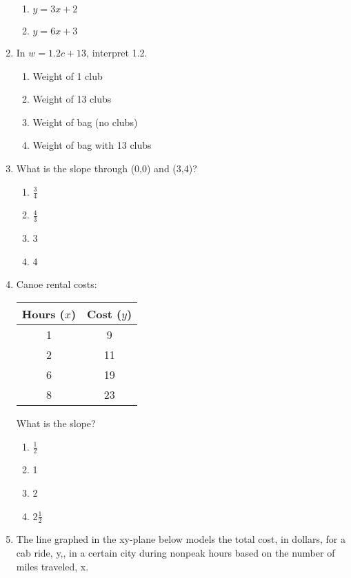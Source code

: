 \documentclass[12pt]{exam}
\begin{document}
\begin{enumerate}
\begin{enumerate}[label=\Alph*)]
        \item $y = 3x + 2$
        \item $y = 6x + 3$
    \end{enumerate}
    \item In $w = 1.2c + 13$, interpret 1.2.
    \begin{enumerate}[label=\Alph*)]
        \item Weight of 1 club
        \item Weight of 13 clubs
        \item Weight of bag (no clubs)
        \item Weight of bag with 13 clubs
    \end{enumerate}
    \item What is the slope through (0,0) and (3,4)?
    \begin{enumerate}[label=\Alph*)]
        \item $\frac{3}{4}$
        \item $\frac{4}{3}$
        \item 3
        \item 4
    \end{enumerate}
    \item Canoe rental costs:
    \begin{center}
        \begin{tabular}{|c|c|}
            \hline
            Hours ($x$) & Cost ($y$) \\
            \hline
            1 & 9 \\
            2 & 11 \\
            6 & 19 \\
            8 & 23 \\
            \hline
        \end{tabular}
    \end{center}
    What is the slope?
    \begin{enumerate}[label=\Alph*)]
        \item $\frac{1}{2}$
        \item 1
        \item 2
        \item $2\frac{1}{2}$
    \end{enumerate}
    \item The line graphed in the xy-plane below models the
total cost, in dollars, for a cab ride, y,, in a certain
city during nonpeak hours based on the number of
miles traveled, x.
    \begin{center}

\end{center}
\end{enumerate}
\end{document}
